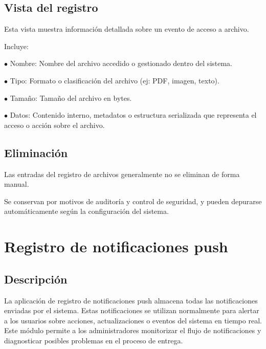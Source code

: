 \documentclass[a4paper]{article}
\begin{document}
\hypertarget{toc19}{}
\subsection{Vista del registro}

Esta vista muestra información detallada sobre un evento de acceso a archivo.

Incluye:

\begin{compactitem}
\item[\color{myblue}$\bullet$] Nombre: Nombre del archivo accedido o gestionado dentro del sistema.
\item[\color{myblue}$\bullet$] Tipo: Formato o clasificación del archivo (ej: PDF, imagen, texto).
\item[\color{myblue}$\bullet$] Tamaño: Tamaño del archivo en bytes.
\item[\color{myblue}$\bullet$] Datos: Contenido interno, metadatos o estructura serializada que representa el acceso o acción sobre el archivo.
\end{compactitem}

\hypertarget{toc20}{}
\subsection{Eliminación}

Las entradas del registro de archivos generalmente no se eliminan de forma manual.

Se conservan por motivos de auditoría y control de seguridad, y pueden depurarse automáticamente según la configuración del sistema.


\hypertarget{toc21}{}
\section{Registro de notificaciones push}

\hypertarget{toc22}{}
\subsection{Descripción}

La aplicación de registro de notificaciones push almacena todas las notificaciones enviadas por el sistema.
Estas notificaciones se utilizan normalmente para alertar a los usuarios sobre acciones, actualizaciones o eventos del sistema en tiempo real.
Este módulo permite a los administradores monitorizar el flujo de notificaciones y diagnosticar posibles problemas en el proceso de entrega.
\end{document}
